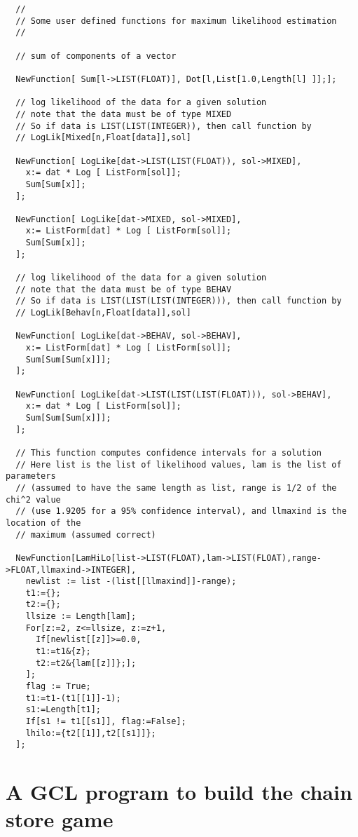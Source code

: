 {\scriptsize
\begin{verbatim}
  //
  // Some user defined functions for maximum likelihood estimation
  // 

  // sum of components of a vector

  NewFunction[ Sum[l->LIST(FLOAT)], Dot[l,List[1.0,Length[l] ]];];

  // log likelihood of the data for a given solution
  // note that the data must be of type MIXED
  // So if data is LIST(LIST(INTEGER)), then call function by  
  // LogLik[Mixed[n,Float[data]],sol]

  NewFunction[ LogLike[dat->LIST(LIST(FLOAT)), sol->MIXED], 
    x:= dat * Log [ ListForm[sol]];
    Sum[Sum[x]];
  ];

  NewFunction[ LogLike[dat->MIXED, sol->MIXED], 
    x:= ListForm[dat] * Log [ ListForm[sol]];
    Sum[Sum[x]];
  ];

  // log likelihood of the data for a given solution
  // note that the data must be of type BEHAV
  // So if data is LIST(LIST(LIST(INTEGER))), then call function by  
  // LogLik[Behav[n,Float[data]],sol]

  NewFunction[ LogLike[dat->BEHAV, sol->BEHAV], 
    x:= ListForm[dat] * Log [ ListForm[sol]];
    Sum[Sum[Sum[x]]];
  ];

  NewFunction[ LogLike[dat->LIST(LIST(LIST(FLOAT))), sol->BEHAV], 
    x:= dat * Log [ ListForm[sol]];
    Sum[Sum[Sum[x]]];
  ];

  // This function computes confidence intervals for a solution
  // Here list is the list of likelihood values, lam is the list of parameters
  // (assumed to have the same length as list, range is 1/2 of the chi^2 value
  // (use 1.9205 for a 95% confidence interval), and llmaxind is the location of the 
  // maximum (assumed correct) 

  NewFunction[LamHiLo[list->LIST(FLOAT),lam->LIST(FLOAT),range->FLOAT,llmaxind->INTEGER], 
    newlist := list -(list[[llmaxind]]-range);
    t1:={};
    t2:={};
    llsize := Length[lam];
    For[z:=2, z<=llsize, z:=z+1,
      If[newlist[[z]]>=0.0, 
      t1:=t1&{z}; 
      t2:=t2&{lam[[z]]};];
    ];
    flag := True;
    t1:=t1-(t1[[1]]-1);
    s1:=Length[t1];
    If[s1 != t1[[s1]], flag:=False];
    lhilo:={t2[[1]],t2[[s1]]};
  ];
\end{verbatim}
}





\newpage
\section{A GCL program to build the chain store game}

